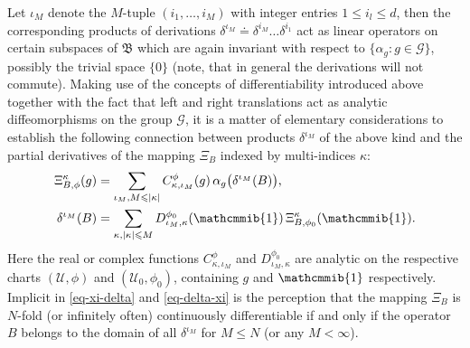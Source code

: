 \documentclass[11pt,twoside,openright]{report}
\theoremstyle{definition}
\theoremstyle{plain}
\theoremstyle{remark}
\theoremstyle{assumption}
\newcommand{\set}[1]{\{ #1 \}}
\newcommand{\bset}[1]{\bigl\{ #1 \bigr\}}
\newcommand{\abs}[1]{\lvert #1 \rvert}
\newcommand{\Bfrak}{\mathfrak{B}}
\newcommand{\Gscr}{\mathscr{G}}
\newcommand{\Uscr}{\mathscr{U}}
\newcommand{\neutral}{\mathcmmib{1}}
\begin{document}
Let $\iota_M$ denote the $M$-tuple $( i_1 , \dots , i_M )$ with
integer entries $1 \leqslant i_l \leqslant d$, then the corresponding
products of derivations $\delta^{\iota_M} \doteq \delta^{i_M} \dots
\delta^{i_1}$ act as linear operators on certain subspaces of $\Bfrak$
which are again invariant with respect to $\bset{\alpha_g : g \in
\Gscr}$, possibly the trivial space $\set{0}$ (note, that in general
the derivations will not commute). Making use of the concepts of
differentiability introduced above together with the fact that left
and right translations act as analytic diffeomorphisms on the group
$\Gscr$, it is a matter of elementary considerations to establish the
following connection between products $\delta^{\iota_M}$ of the above
kind and the partial derivatives of the mapping $\Xi_B$ indexed by
multi-indices $\kappa$:
\begin{subequations}
  \begin{align}
    \label{eq-xi-delta}
    \Xi^\kappa_{B , \phi} ( g ) & = \sum_{\iota_M , M \leqslant
    \abs{\kappa}} C^\phi_{\kappa , \iota_M} ( g ) \, \alpha_g \bigl(
    \delta^{\iota_M} ( B ) \bigr) \text{,} \\
    \label{eq-delta-xi}
    \delta^{\iota_M} ( B ) & = \sum_{\kappa , \abs{\kappa} \leqslant
    M} D^{\phi_0}_{\iota_M , \kappa} ( \neutral ) \, \Xi^\kappa_{B ,
    \phi_0} ( \neutral ) \text{.}
  \end{align}
\end{subequations}
Here the real or complex functions $C^\phi_{\kappa , \iota_M}$ and
$D^{\phi_0}_{\iota_M , \kappa}$ are analytic on the respective charts
$( \Uscr , \phi )$ and $( \Uscr_0 , \phi_0 )$, containing $g$ and
$\neutral$ respectively. Implicit in \eqref{eq-xi-delta} and
\eqref{eq-delta-xi} is the perception that the mapping $\Xi_B$ is
$N$-fold (or infinitely often) continuously differentiable if and only
if the operator $B$ belongs to the domain of all $\delta^{\iota_M}$
for $M \leqslant N$ (or any $M < \infty$).
\end{document}
